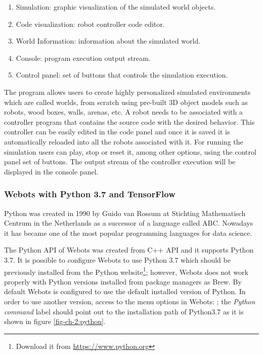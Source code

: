 \begin{enumerate}
	\item Simulation: graphic visualization of the simulated world objects.
	\item Code visualization: robot controller code editor.
	\item World Information: information about the simulated world.
	\item Console: program execution output stream.
	\item Control panel: set of buttons that controls the simulation execution.
\end{enumerate}

The program allows users to create highly personalized simulated environments which are called worlds, from scratch using pre-built 3D object models such as robots, wood boxes, walls, arenas, etc. A robot needs to be associated with a controller program that contains the source code with the desired behavior. This controller can be easily edited in the code panel and once it is saved it is automatically reloaded into all the robots associated with it. For running the simulation users can play, stop or reset it, among other options, using the control panel set of buttons. The output stream of the controller execution will be displayed in the console panel. 


\subsubsection{Webots with Python 3.7 and TensorFlow}

Python was created in 1990 by Guido van Rossum at Stichting Mathematisch Centrum in the Netherlands as a successor of a language called ABC\cite{python-docs}. Nowadays it has became one of the most popular programming languages for data science\cite{Raschka:2015:PML:2886323}.

The Python API of Webots was created from C++ API and it supports Python 3.7. It is possible to configure Webots to use Python 3.7 which should be previously installed from the Python website\footnote{Download it from \url{https://www.python.org}}; however, Webots does not work properly with Python versions installed from package managers as Brew. By default Webots is configured to use the default installed version of Python. In order to use another version, access to the menu options in Webots: ; the \textit{Python command} label should point out to the installation path of Python3.7 as it is shown in figure \ref{fig-ch-2:python}. 

